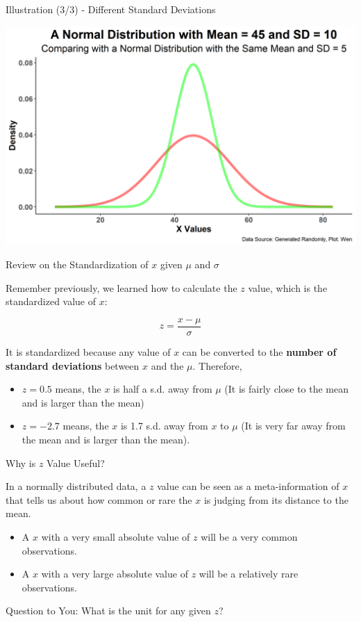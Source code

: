 \documentclass{beamer}
\begin{document}
\begin{frame}{Illustration (3/3) - Different Standard Deviations }

\begin{center}
\includegraphics[scale=.55]{images/mean45sd10sd5.png}

\end{center}

\end{frame}




\begin{frame}{Review on the Standardization of $x$ given $\mu$ and $\sigma$}

Remember previously, we learned how to calculate the $z$ value, which is the standardized value of $x$:

$$z = \frac{x-\mu}{\sigma}$$

It is standardized because any value of $x$ can be converted to the \textbf{number of standard deviations} between $x$ and the $\mu$. Therefore, 
\begin{itemize}
\item $z = 0.5$ means, the $x$ is half a s.d. away from $\mu$ (It is fairly close to the mean and is larger than the mean)
\item $z = -2.7$ means, the $x$ is 1.7 s.d. away from $x$ to $\mu$ (It is very far away from the mean and is larger than the mean).
\end{itemize}
\end{frame}



\begin{frame}{Why is $z$ Value Useful?}

In a normally distributed data, a $z$ value can be seen as a meta-information of $x$ that tells us about how common or rare the $x$ is judging from its distance to the mean.

\begin{itemize}
\item A $x$ with a very small absolute value of $z$ will be a very common observations. 
\item A $x$ with a very large absolute value of $z$ will be a relatively rare observations. 
\end{itemize}

Question to You: What is the unit for any given $z$? 

\end{frame}
\end{document}
